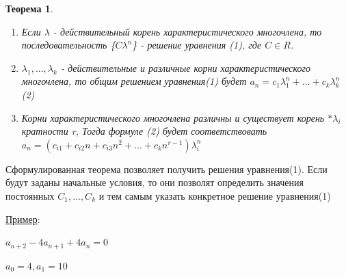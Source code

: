 \documentclass[12pt, a4paper, oneside]{article}
\theoremstyle{plain} %
\newtheorem{theorem}{Теорема}[section]
\theoremstyle{definition}
\newcommand{\indef}[1]{\textbf{ \color{dark_red} #1}}
\begin{document}
\begin{theorem} 

\begin{enumerate}
\item Если $\lambda$ - действительный корень характеристического многочлена, то последовательность \{$C\lambda^n$\} - решение уравнения (1), где $C \in R$.
\item $\lambda_1, ... , \lambda_k$ - действительные и различные корни характеристического многочлена, то общим решением уравнения(1) будет \indef{$a_n=c_1 \lambda_1^n+ ... +c_k \lambda_k^n $}(2)
\item Корни характеристического многочлена различны и существует корень $*\lambda_i$ кратности r, Тогда формуле (2) будет соответствовать \indef{$a_n=(c_{i1}+c_{i2} n+c_{i3} n^2+ ... +c_k n^{r-1}) \lambda_i^n $}
\end{enumerate}

\end{theorem}

Сформулированная теорема позволяет получить решения уравнения(1). Если будут заданы начальные условия, то они позволят определить  значения постоянных $C_1,..., C_k$ и тем самым указать конкретное решение уравнения(1)

\underline{Пример}:

$a_{n+2} - 4 a_{n+1} + 4 {a_n} = 0$ 

$a_0 = 4 , a_1 = 10$
\end{document}
